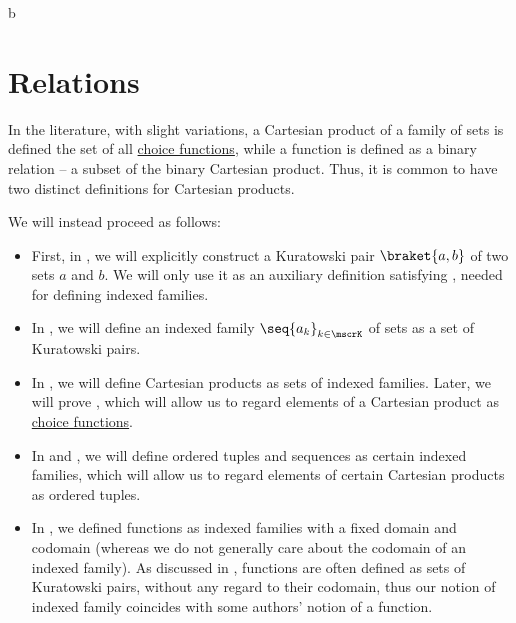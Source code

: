 b\section{Relations}\label{sec:relations}

\begin{remark}\label{rem:cartesian_products_and_functions}
  In the literature, with slight variations, a Cartesian product of a family of sets is defined the set of all \hyperref[def:choice_function]{choice functions}, while a function is defined as a binary relation -- a subset of the binary Cartesian product. Thus, it is common to have two distinct definitions for Cartesian products.

  We will instead proceed as follows:
  \begin{itemize}
    \item First, in , we will explicitly construct a Kuratowski pair \( \braket{ a, b } \) of two sets \( a \) and \( b \). We will only use it as an auxiliary definition satisfying , needed for defining indexed families.

    \item In , we will define an indexed family \( \seq{ a_k }_{k \in \mscrK} \) of sets as a set of Kuratowski pairs.

    \item In , we will define Cartesian products as sets of indexed families. Later, we will prove , which will allow us to regard elements of a Cartesian product as \hyperref[def:choice_function]{choice functions}.

    \item In  and , we will define ordered tuples and sequences as certain indexed families, which will allow us to regard elements of certain Cartesian products as ordered tuples.

    \item In , we defined functions as indexed families with a fixed domain and codomain (whereas we do not generally care about the codomain of an indexed family). As discussed in , functions are often defined as sets of Kuratowski pairs, without any regard to their codomain, thus our notion of indexed family coincides with some authors' notion of a function.
  \end{itemize}


\end{remark}
